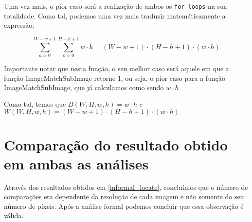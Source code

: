 Uma vez mais, o pior caso será a realização de ambos os
\verb|for loops| na sua totalidade. Como tal, podemos
uma vez mais traduzir matemáticamente a expressão:

\begin{equation}
	\sum_{a=0}^{W-w+1}\sum_{b=0}^{H-h+1}w\cdot h = (W-w+1)\cdot(H-h+1)\cdot(w\cdot h)
\end{equation}

Importante notar que nesta função, o seu melhor caso será
aquele em que a função ImageMatchSubImage retorne 1, ou
seja, o pior caso para a função ImageMatchSubImage, que já
calculamos como sendo $w \cdot h$

Como tal, temos que $B(W,H,w,h) = w\cdot h$ e $W(W,H,w,h) = (W-w+1)\cdot(H-h+1)\cdot(w\cdot h)$
\section[Resultados]{Comparação do resultado obtido em ambas as análises}

Através dos resultados obtidos em \ref{informal_locate},
concluímos que o número de comparações era dependente da
resolução de cada imagem e não somente do seu número de píxeis. Após a análise formal podemos concluir que
essa observação é válida.
